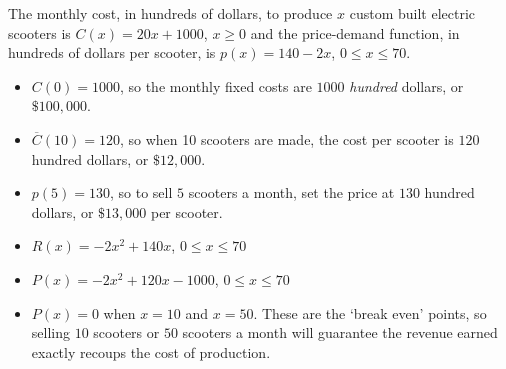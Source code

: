 {The monthly cost, in hundreds of dollars, to produce $x$ custom built electric scooters is $C(x) = 20x + 1000$, $x \geq 0$ and the price-demand function, in  hundreds of dollars per scooter,  is $p(x) = 140-2x$, $0 \leq x \leq 70$.}
{ \begin{itemize}

\item  $C(0) = 1000$, so the monthly fixed costs are $1000$ \textit{hundred} dollars, or $\$100,\!000$.

\item  $\overline{C}(10) = 120$, so when 10 scooters are made, the cost per scooter is $120$ hundred dollars, or $\$12,\!000$.

\item  $p(5) = 130$, so to sell $5$ scooters a month, set the price at $130$ hundred dollars, or $\$13,\!000$ per scooter.

\item $R(x) = -2x^2+140x$, $0 \leq x \leq 70$

\item  $P(x) = -2x^2+120x-1000$, $0 \leq x \leq 70$

\item  $P(x) = 0$ when $x = 10$ and $x=50$.  These are the `break even' points, so selling $10$ scooters or $50$ scooters a month will guarantee the revenue earned exactly recoups the cost of production.

\end{itemize}}